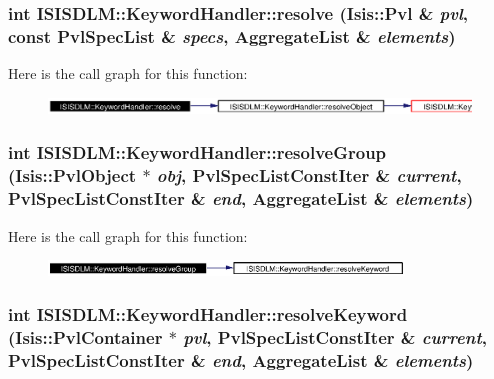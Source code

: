 \subsubsection{\setlength{\rightskip}{0pt plus 5cm}int ISISDLM::Keyword\-Handler::resolve (Isis::Pvl \& {\em pvl}, const {\bf Pvl\-Spec\-List} \& {\em specs}, {\bf Aggregate\-List} \& {\em elements})\hspace{0.3cm}{\tt  [private]}}\label{classISISDLM_1_1KeywordHandler_d2}




Here is the call graph for this function:\begin{figure}[H]
\begin{center}
\leavevmode
\includegraphics[width=370pt]{classISISDLM_1_1KeywordHandler_d2_cgraph}
\end{center}
\end{figure}
\subsubsection{\setlength{\rightskip}{0pt plus 5cm}int ISISDLM::Keyword\-Handler::resolve\-Group (Isis::Pvl\-Object $\ast$ {\em obj}, {\bf Pvl\-Spec\-List\-Const\-Iter} \& {\em current}, {\bf Pvl\-Spec\-List\-Const\-Iter} \& {\em end}, {\bf Aggregate\-List} \& {\em elements})\hspace{0.3cm}{\tt  [private]}}\label{classISISDLM_1_1KeywordHandler_d4}




Here is the call graph for this function:\begin{figure}[H]
\begin{center}
\leavevmode
\includegraphics[width=268pt]{classISISDLM_1_1KeywordHandler_d4_cgraph}
\end{center}
\end{figure}
\subsubsection{\setlength{\rightskip}{0pt plus 5cm}int ISISDLM::Keyword\-Handler::resolve\-Keyword (Isis::Pvl\-Container $\ast$ {\em pvl}, {\bf Pvl\-Spec\-List\-Const\-Iter} \& {\em current}, {\bf Pvl\-Spec\-List\-Const\-Iter} \& {\em end}, {\bf Aggregate\-List} \& {\em elements})\hspace{0.3cm}{\tt  [private]}}\label{classISISDLM_1_1KeywordHandler_d5}


